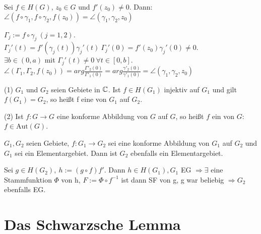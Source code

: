 \documentclass[a4paper,twoside,DIV15,BCOR12mm]{scrbook}
\def\MdD{\mathbb{D}}
\begin{document}
\begin{satz}[Winkeltreue] %
	Sei $f \in H(G)$, $z_0 \in G$ und $f'(z_0) \neq 0$. Dann: \\
	$\angle( f \circ \gamma_1, f \circ \gamma_2, f(z_0) ) = \angle( \gamma_1, \gamma_2, z_0 )$
\end{satz}

\begin{beweis}
	$\Gamma_j := f \circ \gamma_j\ ( j = 1, 2 )$. $\Gamma_j'(t) = f'(\gamma_j(t)) \gamma_j'(t)\ 
	\Gamma_j'(0) = f'(z_0)\gamma_j'(0) \neq 0$. \\
	$\exists b \in (0,a)$ mit $\Gamma_j'(t) \neq 0\ \forall t \in [0,b]$.\\
	$\angle(\Gamma_1, \Gamma_2, f(z_0)) = arg  \frac{\Gamma'_2(0)}{\Gamma'_1(0)} = arg \frac{\gamma'_2(0)}{\gamma'_1(0)} = \angle( \gamma_1, \gamma_2, z_0 )$
\end{beweis}

\begin{definition}
	\begin{liste}
		\item[ (1) ] $G_1$ und $G_2$ seien Gebiete in $\mathbb{C}$. Ist $f \in H(G_1)$ injektiv auf $G_1$ und gilt
			$f(G_1) = G_2$, so heißt f eine \begriff{konforme Abbildung} von $G_1$ auf $G_2$.
		\item[ (2) ] Ist $f: G \rightarrow G$ eine konforme Abbildung von $G$ auf $G$, so heißt $f$ ein  von $G$: \\
			$f \in \mbox{Aut}(G)$.
	\end{liste}
\end{definition}

\begin{satz}
	$G_1, G_2$ seien  Gebiete, $f: G_1 \rightarrow G_2$ sei eine konforme Abbildung von $G_1$ auf $G_2$ und $G_1$ sei ein Elementargebiet. 
	Dann ist $G_2$ ebenfalls ein Elementargebiet.
\end{satz}

\begin{beweis}
Sei $g \in H(G_2),\ h := (g \circ f) f'$.
Dann $h \in H(G_1), G_1$ EG $\Rightarrow \exists$ eine Stammfunktion $\Phi$ von h, $F := \Phi \circ f^{-1}$ ist dann SF von g, g war beliebig $\Rightarrow G_2$ ebenfalls EG. 
\end{beweis}

\chapter{Das Schwarzsche Lemma} %
\end{document}
